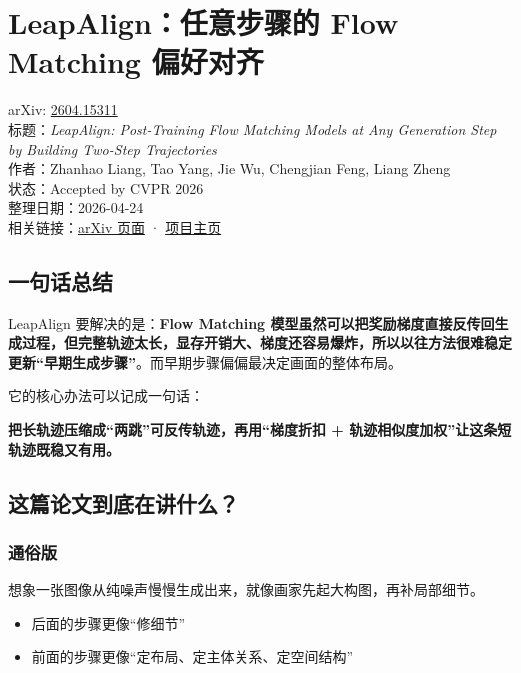 
\section{LeapAlign：任意步骤的 Flow Matching 偏好对齐}

\begin{conceptbox}
arXiv: \href{https://arxiv.org/abs/2604.15311}{2604.15311}\\
标题：\textit{LeapAlign: Post-Training Flow Matching Models at Any Generation Step by Building Two-Step Trajectories}\\
作者：Zhanhao Liang, Tao Yang, Jie Wu, Chengjian Feng, Liang Zheng\\
状态：Accepted by CVPR 2026\\
整理日期：2026-04-24\\
相关链接：\href{https://arxiv.org/abs/2604.15311}{arXiv 页面} · \href{https://rockeycoss.github.io/leapalign/}{项目主页}
\end{conceptbox}

\subsection{一句话总结}

LeapAlign 要解决的是：\textbf{Flow Matching 模型虽然可以把奖励梯度直接反传回生成过程，但完整轨迹太长，显存开销大、梯度还容易爆炸，所以以往方法很难稳定更新“早期生成步骤”}。而早期步骤偏偏最决定画面的整体布局。

它的核心办法可以记成一句话：

\textbf{把长轨迹压缩成“两跳”可反传轨迹，再用“梯度折扣 + 轨迹相似度加权”让这条短轨迹既稳又有用。}

\subsection{这篇论文到底在讲什么？}

\subsubsection{通俗版}

想象一张图像从纯噪声慢慢生成出来，就像画家先起大构图，再补局部细节。

\begin{itemize}[leftmargin=1.5em]
  \item 后面的步骤更像“修细节”
  \item 前面的步骤更像“定布局、定主体关系、定空间结构”
\end{itemize}


